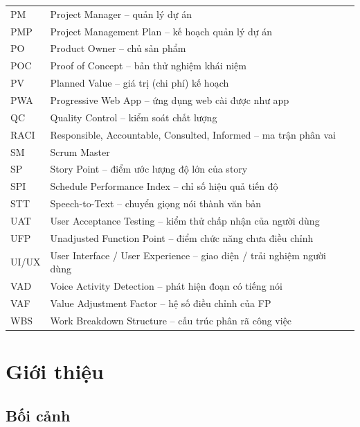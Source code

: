 \documentclass[12pt,a4paper]{report}
\begin{document}
\begin{longtable}{@{}P{2.2cm}P{13.2cm}@{}}
    PM     & Project Manager -- quản lý dự án \\
    PMP    & Project Management Plan -- kế hoạch quản lý dự án \\
    PO     & Product Owner -- chủ sản phẩm \\
    POC    & Proof of Concept -- bản thử nghiệm khái niệm \\
    PV     & Planned Value -- giá trị (chi phí) kế hoạch \\
    PWA    & Progressive Web App -- ứng dụng web cài được như app \\
    QC     & Quality Control -- kiểm soát chất lượng \\
    RACI   & Responsible, Accountable, Consulted, Informed -- ma trận phân vai \\
    SM     & Scrum Master \\
    SP     & Story Point -- điểm ước lượng độ lớn của story \\
    SPI    & Schedule Performance Index -- chỉ số hiệu quả tiến độ \\
    STT    & Speech-to-Text -- chuyển giọng nói thành văn bản \\
    UAT    & User Acceptance Testing -- kiểm thử chấp nhận của người dùng \\
    UFP    & Unadjusted Function Point -- điểm chức năng chưa điều chỉnh \\
    UI/UX  & User Interface / User Experience -- giao diện / trải nghiệm người dùng \\
    VAD    & Voice Activity Detection -- phát hiện đoạn có tiếng nói \\
    VAF    & Value Adjustment Factor -- hệ số điều chỉnh của FP \\
    WBS    & Work Breakdown Structure -- cấu trúc phân rã công việc \\
  \end{longtable}
\endgroup

\cleardoublepage{}
{}
\listoffigures

\cleardoublepage{}
{}
\listoftables

\chapter{Giới thiệu}
\label{chap:intro}

\section{Bối cảnh}
\end{document}
